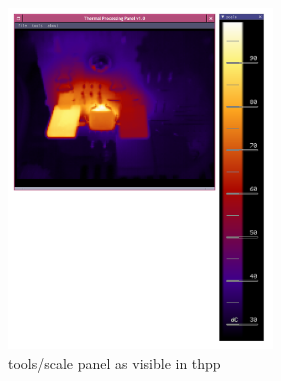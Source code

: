 \documentclass[12pt,twoside,a4paper,titlepage]{report}
\begin{document}
\begin{figure}[ht]
 \centering
 \includegraphics[width=7cm, keepaspectratio=true width=10cm]{img/tools_scale}
 \caption{tools/scale panel as visible in thpp}
 \label{fig:tools-scale}
\end{figure}
\end{document}
